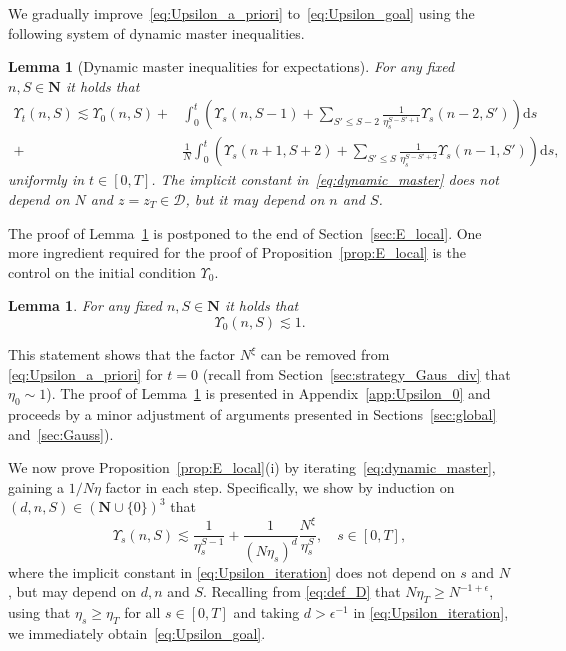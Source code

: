 \documentclass[10pt]{amsart}
\newtheorem{lemma}[theorem]{Lemma}
\numberwithin{equation}{section}
\newcommand{\dif}{\mathrm{d}}
\newcommand{\N}{\mathbf{N}}
\begin{document}
We gradually improve~\eqref{eq:Upsilon_a_priori} to~\eqref{eq:Upsilon_goal} using the following system of dynamic master inequalities.

\begin{lemma}[Dynamic master inequalities for expectations]\label{lem:dynamic_master} For any fixed $n,S\in\N$ it holds that
\begin{equation}
\begin{split}
\Upsilon_t(n,S)\lesssim \Upsilon_0(n,S) + &\int_0^t \left(\Upsilon_s(n,S-1) + \sum_{S'\le S-2} \frac{1}{\eta^{S-S'+1}_s}\Upsilon_s(n-2,S')\right)\dif s\\
+&\frac{1}{N}\int_0^t \left(\Upsilon_s(n+1,S+2) + \sum_{S'\le S}\frac{1}{\eta^{S-S'+2}_s}\Upsilon_s(n-1,S')\right)\dif s,
\end{split}
\label{eq:dynamic_master}
\end{equation}
uniformly in $t\in [0,T]$. The implicit constant in~\eqref{eq:dynamic_master} does not depend on $N$ and $z=z_T\in\mathcal{D}$, but it may depend on $n$ and $S$.
\end{lemma}

The proof of Lemma~\ref{lem:dynamic_master} is postponed to the end of Section~\ref{sec:E_local}. One more ingredient required for the proof of Proposition~\ref{prop:E_local} is the control on the initial condition $\Upsilon_0$.

\begin{lemma}\label{lem:Upsilon_0} For any fixed $n,S\in\N$ it holds that
\begin{equation}
\Upsilon_0(n,S)\lesssim 1.
\label{eq:Upsilon_0}
\end{equation}
\end{lemma}

This statement shows that the factor $N^\xi$ can be removed from \eqref{eq:Upsilon_a_priori} for $t=0$ (recall from Section~\ref{sec:strategy_Gaus_div} that $\eta_0\sim 1$). The proof of Lemma~\ref{lem:Upsilon_0} is presented in Appendix~\ref{app:Upsilon_0} and proceeds by a minor adjustment of arguments presented in Sections~\ref{sec:global} and~\ref{sec:Gauss}).


We now prove Proposition~\ref{prop:E_local}(i) by iterating~\eqref{eq:dynamic_master}, gaining a $1/N\eta$ factor in each step.  Specifically, we show by induction on $(d,n,S)\in(\N\cup\{0\})^3$ that 
\begin{equation}
\Upsilon_s(n,S) \lesssim \frac{1}{\eta_s^{S-1}} + \frac{1}{(N\eta_s)^d}\frac{N^\xi}{\eta_s^S},\quad s\in [0,T],
\label{eq:Upsilon_iteration}
\end{equation}
where the implicit constant in \eqref{eq:Upsilon_iteration} does not depend on $s$ and $N$, but may depend on $d,n$ and $S$. Recalling from \eqref{eq:def_D} that $N\eta_T\ge N^{-1+\epsilon}$, using that $\eta_s\ge \eta_T$ for all $s\in [0,T]$ and taking $d>\epsilon^{-1}$ in \eqref{eq:Upsilon_iteration}, we immediately obtain~\eqref{eq:Upsilon_goal}.
\end{document}
